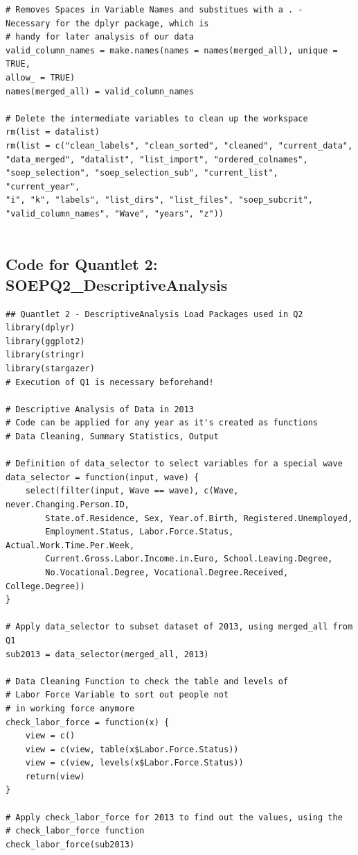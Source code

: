 \documentclass[a4paper]{article}
\begin{document}
{\begin{lstlisting}[numbers=none]
# Removes Spaces in Variable Names and substitues with a . - 
Necessary for the dplyr package, which is
# handy for later analysis of our data
valid_column_names = make.names(names = names(merged_all), unique = TRUE, 
allow_ = TRUE)
names(merged_all) = valid_column_names

# Delete the intermediate variables to clean up the workspace
rm(list = datalist)
rm(list = c("clean_labels", "clean_sorted", "cleaned", "current_data", 
"data_merged", "datalist", "list_import", "ordered_colnames",
"soep_selection", "soep_selection_sub", "current_list", "current_year", 
"i", "k", "labels", "list_dirs", "list_files", "soep_subcrit", 
"valid_column_names", "Wave", "years", "z"))


\end{lstlisting}
\newpage
\subsection{Code for Quantlet 2: SOEPQ2\_DescriptiveAnalysis}
\begin{lstlisting}
## Quantlet 2 - DescriptiveAnalysis Load Packages used in Q2
library(dplyr)
library(ggplot2)
library(stringr)
library(stargazer)
# Execution of Q1 is necessary beforehand!

# Descriptive Analysis of Data in 2013 
# Code can be applied for any year as it's created as functions
# Data Cleaning, Summary Statistics, Output

# Definition of data_selector to select variables for a special wave
data_selector = function(input, wave) {
    select(filter(input, Wave == wave), c(Wave, never.Changing.Person.ID, 
    	State.of.Residence, Sex, Year.of.Birth, Registered.Unemployed, 
        Employment.Status, Labor.Force.Status, Actual.Work.Time.Per.Week, 
        Current.Gross.Labor.Income.in.Euro, School.Leaving.Degree, 
        No.Vocational.Degree, Vocational.Degree.Received, College.Degree))
}

# Apply data_selector to subset dataset of 2013, using merged_all from Q1
sub2013 = data_selector(merged_all, 2013)

# Data Cleaning Function to check the table and levels of 
# Labor Force Variable to sort out people not
# in working force anymore
check_labor_force = function(x) {
    view = c()
    view = c(view, table(x$Labor.Force.Status))
    view = c(view, levels(x$Labor.Force.Status))
    return(view)
}

# Apply check_labor_force for 2013 to find out the values, using the 
# check_labor_force function
check_labor_force(sub2013)


\end{lstlisting}}
\end{document}
